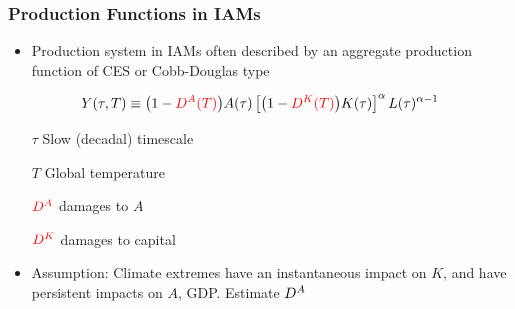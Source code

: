 \documentclass[
c,
11pt,
aspectratio=169, %
final,
]{beamer}
\begin{document}
\begin{frame}
  \frametitle{Production Functions in IAMs}
  \begin{itemize}
  \item  Production system in IAMs often described by an aggregate production function of CES or Cobb-Douglas type
  \end{itemize}
  \vfill
  \begin{equation*}
    \label{eq:CD}
    Y(\tau,T)\equiv \big(1-\tc{red}{\DA(T)}\big)A(\tau)\left[\big(1-\tc{red}{\DK(T)}\big)K(\tau) \right]^\alpha L(\tau)^{\alpha-1}
  \end{equation*}
  \vfill
  \begin{minipage}[l]{.45\linewidth}
   \begin{itemize} 
   \item [$\tau$] Slow (decadal) timescale
   \item [$T$] Global temperature
   \end{itemize}
\end{minipage}\hfill
\begin{minipage}[l]{.45\linewidth}
  \begin{itemize}
  \item [$\tc{red}{\DA}$]  damages to $A$ 
   \item [$\tc{red}{\DK}$]  damages to capital
   \end{itemize}
 \end{minipage}
 
 \vfill
 \begin{itemize}
 \item Assumption: Climate extremes have an instantaneous impact on $K$, and have persistent impacts on $A$, GDP.
   \arrowitem Estimate $\DA$
   \end{itemize}
\end{frame}
\end{document}

